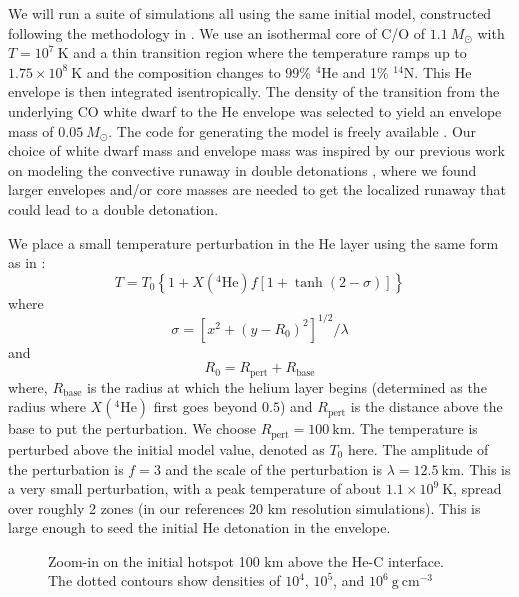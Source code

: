 \documentclass[preprint,linenumbers]{aastex631}
\newcommand{\isot}[2]{$^{#2}\mathrm{#1}$}
\newcommand{\isotm}[2]{{}^{#2}\mathrm{#1}}
\newcommand{\gcc}{\mathrm{g~cm^{-3} }}
\begin{document}
We will run a suite of simulations all using the same initial model,
constructed following the methodology in \citet{subchandra}.  We use
an isothermal core of C/O of $1.1~M_\odot$ with $T = 10^7~\mathrm{K}$
and a thin transition region where the temperature ramps up to
$1.75\times 10^8~\mathrm{K}$ and the composition changes to 99\%
\isot{He}{4} and 1\% \isot{N}{14}.  This He envelope is then
integrated isentropically.  The density of the transition from the
underlying CO white dwarf to the He envelope was selected to yield an
envelope mass of $0.05~M_\odot$.  The code for generating the model is
freely available \citep{initial_models}.
Our choice of white dwarf mass and
envelope mass was inspired by our previous work on modeling the convective runaway in double detonations \citep{jacobs:2016}, where we found larger envelopes and/or core masses are needed to get the localized runaway that could lead to a double detonation.

We place a small temperature perturbation in the He layer using the
same form as in \citet{castro_simple_sdc}:
\begin{equation}
  T = T_0 \left \{ 1 + X(\isotm{He}{4}) f \left [1 + \tanh(2 - \sigma) \right ] \right \}
\end{equation}
where
\begin{equation}
  \sigma = \left [ x^2 + (y - R_0)^2 \right ]^{1/2} / \lambda
\end{equation}
and
\begin{equation}
  R_0 = R_\mathrm{pert} + R_\mathrm{base}
\end{equation}
where, $R_\mathrm{base}$ is the radius at which the helium layer
begins (determined as the radius where $X(\isotm{He}{4})$ first goes beyond $0.5$) and $R_\mathrm{pert}$ is the distance above the base to put the
perturbation.  We choose $R_\mathrm{pert} = 100~\mathrm{km}$.  The
temperature is perturbed above the initial model value, denoted as
$T_0$ here.  The amplitude of the perturbation is $f = 3$ and the
scale of the perturbation is $\lambda = 12.5~\mathrm{km}$.  This is a
very small perturbation, with a peak temperature of about $1.1\times
10^9~\mathrm{K}$, spread over roughly 2 zones (in our references 20 km resolution simulations).  This
is large enough to seed the initial He detonation in the
envelope.

\begin{figure}
\centering
{}
\caption{\label{fig:initial_hotspot} Zoom-in on the initial hotspot 100 km above the He-C interface.  The dotted contours show densities
of $10^4$, $10^5$, and $10^6~\gcc$}
\end{figure}
\end{document}
